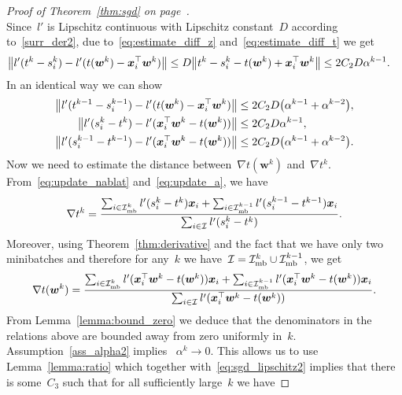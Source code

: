 \begin{proof}[Proof of Theorem~\ref{thm:sgd} on page~\pageref{thm:sgd}]
\begin{equation}
  \end{equation}
  Since~$l'$ is Lipschitz continuous with Lipschitz constant~$D$ according to~\ref{surr_der2}, due to~\eqref{eq:estimate_diff_z} and~\eqref{eq:estimate_diff_t} we get
  \begin{equation}\label{eq:sgd_lipschitz1}
    \begin{aligned}
      \norm{l'(t^k-s_i^k) - l'(t(\bm{w}^k)-\bm{x}_i^\top \bm{w}^k)}
        & \le D \norm{t^k-s_i^k - t(\bm{w}^k)+ \bm{x}_i^\top \bm{w}^k}
        \le  2C_2 D \alpha^{k-1}.
    \end{aligned}
  \end{equation}
  In an identical way we can show
  \begin{equation}\label{eq:sgd_lipschitz2}
    \begin{aligned}
      \norm{l'(t^{k-1}-s_i^{k-1}) - l'(t(\bm{w}^k)-\bm{x}_i^\top \bm{w}^k)}
        & \le 2C_2D\Brac{\alpha^{k-1}+\alpha^{k-2}}, \\
      \norm{l'(s_i^k-t^k) - l'(\bm{x}_i^\top \bm{w}^k-t(\bm{w}^k))}
        & \le 2C_2D\alpha^{k-1}, \\
      \norm{l'(s_i^{k-1}-t^{k-1}) - l'(\bm{x}_i^\top \bm{w}^k-t(\bm{w}^k))}
        & \le 2C_2D\Brac{\alpha^{k-1}+\alpha^{k-2}}.
    \end{aligned}
  \end{equation}
  Now we need to estimate the distance between~$\nabla t(\bm{w}^k)$ and~$\nabla t^k$. From~\eqref{eq:update_nablat} and~\eqref{eq:update_a}, we have
  \begin{equation*}
    \nabla t^k
      = \frac{\sum_{i \in \mathcal{I}_{\text{mb}}^k} l'(s_i^k - t^k)\bm{x}_i + \sum_{i \in \mathcal{I}_{\text{mb}}^{k-1}} l'(s_i^{k-1} - t^{k-1}) \bm{x}_i}{\sum_{i \in \mathcal{I}} l'(s_i^k - t^k)}.
  \end{equation*}
  Moreover, using Theorem~\ref{thm:derivative} and the fact that we have only two minibatches and therefore for any~$k$ we have~$\mathcal{I} = \mathcal{I}_{\text{mb}}^k \cup \mathcal{I}_{\text{mb}}^{k-1}$, we get
  \begin{equation*}
    \nabla t(\bm{w}^k)
      = \frac{\sum_{i \in \mathcal{I}_{\text{mb}}^k} l'(\bm{x}_i^\top \bm{w}^k - t(\bm{w}^k))\bm{x}_i + \sum_{i \in \mathcal{I}_{\text{mb}}^{k-1}} l'(\bm{x}_i^\top \bm{w}^k - t(\bm{w}^k))\bm{x}_i}{\sum_{i \in \mathcal{I}} l'(\bm{x}_i^\top \bm{w}^k - t(\bm{w}^k))}.
  \end{equation*}
  From Lemma~\ref{lemma:bound_zero} we deduce that the denominators in the relations above are bounded away from zero uniformly in~$k$. Assumption~\ref{ass_alpha2} implies ~$\alpha^k \to 0$. This allows us to use Lemma~\ref{lemma:ratio} which together with~\eqref{eq:sgd_lipschitz2} implies that there is some~$C_3$ such that for all sufficiently large~$k$ we have

\end{proof}
